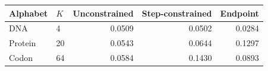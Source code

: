 \begin{tabular}{llrrr}
\toprule
Alphabet & $K$ & Unconstrained & Step-constrained & Endpoint \\
\midrule
DNA & 4 & 0.0509 & 0.0502 & 0.0284 \\
Protein & 20 & 0.0543 & 0.0644 & 0.1297 \\
Codon & 64 & 0.0584 & 0.1430 & 0.0893 \\
\bottomrule
\end{tabular}